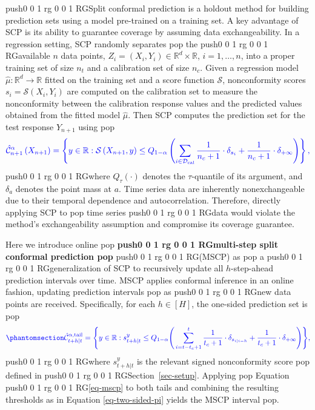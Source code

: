 \documentclass[
  american,
  12pt]{article}
\theoremstyle{plain}
\theoremstyle{plain}
\theoremstyle{remark}
\newcommand{\CPTSadd}[1]{\ifmmode\else\leavevmode\fi\pdfcolorstack 0 push{0 0 1 rg 0 0 1 RG}#1\pdfcolorstack 0 pop}
\begin{document}
\CPTSadd{Split conformal prediction \citep[SCP,][]{papadopoulos2002, vovk2005} is
a holdout method for building prediction sets using a model pre-trained
on a training set. A key advantage of SCP is its ability to guarantee
coverage by assuming data exchangeability. In a regression setting, SCP
randomly separates} the \CPTSadd{available \(n\) data points,
\(Z_i = (X_i, Y_i) \in \mathbb{R}^d \times \mathbb{R}\),
\(i=1, \dots, n\), into a proper training set of size \(n_t\) and a
calibration set of size \(n_c\). Given a regression model
\(\hat{\mu}: \mathbb{R}^d \rightarrow \mathbb{R}\) fitted on the
training set and a score function \(\mathcal{S}\), nonconformity scores
\(s_i = \mathcal{S}\left(X_i, Y_i\right)\) are computed on the
calibration set to measure the nonconformity between the calibration
response values and the predicted values obtained from the fitted model
\(\hat{\mu}\). Then SCP computes the prediction set for the test
response \(Y_{n+1}\) using} \[
\CPTSadd{\hat{\mathcal{C}}_{n+1}^{\alpha}\left(X_{n+1}\right) = \left\{y\in\mathbb{R}: \mathcal{S}\left(X_{n+1}, y\right) \leq Q_{1-\alpha}\left(\sum_{i \in \mathcal{D}_{\text{cal}}}\frac{1}{n_c+1}\cdot\delta_{s_{i}}+\frac{1}{n_c+1}\cdot\delta_{+\infty}\right)\right\},}
\] \CPTSadd{where \(Q_\tau(\cdot)\) denotes the \(\tau\)-quantile of its
argument, and \(\delta_a\) denotes the point mass at \(a\). Time series
data are inherently nonexchangeable due to their temporal dependence and
autocorrelation. Therefore, directly applying SCP to} time series \CPTSadd{data
would violate the method's exchangeability assumption and compromise its
coverage guarantee.

Here we introduce online} \textbf{\CPTSadd{multi-step split conformal prediction}}
\CPTSadd{(MSCP) as} a \CPTSadd{generalization of SCP \citep{papadopoulos2002, vovk2005} to
recursively update all \(h\)-step-ahead prediction intervals over time.
MSCP applies conformal inference in an online fashion, updating
prediction intervals} as \CPTSadd{new data points are received. Specifically, for
each \(h \in [H]\), the one-sided prediction set is}
\begin{equation}\CPTSadd{\phantomsection\label{eq-mscp}{
\hat{\mathcal{C}}_{t+h|t}^{\alpha,\mathrm{tail}} = \Bigg\{y\in\mathbb{R}: s_{t+h|t}^{y} \leq Q_{1-\alpha}\Bigg(\sum_{i=t-t_c+1}^{t}\frac{1}{t_c+1}\cdot\delta_{s_{i|i-h}}+\frac{1}{t_c+1}\cdot\delta_{+\infty}\Bigg)\Bigg\},
}}\end{equation} \CPTSadd{where \(s_{t+h|t}^{y}\) is the relevant signed
nonconformity score} defined in \CPTSadd{Section~\ref{sec-setup}. Applying}
Equation \CPTSadd{\eqref{eq-mscp} to both tails and combining the resulting
thresholds as in Equation \eqref{eq-two-sided-pi} yields the MSCP
interval}.
\end{document}
